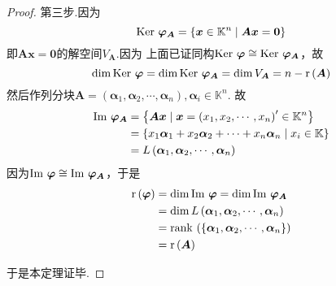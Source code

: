 {\begin{proof}
        第三步.因为
        \[
            \operatorname{Ker\,} \bm{\varphi}_{\bm{A}}
            =\left\{\bm{x}\in \mathbb{K}^n\mid\bm{Ax}=\bm{0}
            \right\}
        \]
        即$\bm{Ax}=\bm{0}$的解空间$V_{\bm{A}}$.因为
        上面已证同构$\operatorname{Ker\,} \bm{\varphi}\cong \operatorname{Ker\,} \bm{\varphi}_{\bm{A}}$，故
        \[
            \dim\operatorname{Ker\,} \bm{\varphi}=\dim\operatorname{Ker\,} \bm{\varphi}_{\bm{A}}=\dim V_{\bm{A}}=n-\mathrm{r} \left(\bm{A}
            \right)
        \]
        然后作列分块$\bm{A}=\left(\bm{\alpha}_1,\bm{\alpha}_2,\cdots,\bm{\alpha}_n\right),\bm{\alpha}_i\in \mathbb{K}^n.$
        故
        \begin{align*}
            \operatorname{Im\,}\bm{\varphi}_{\bm{A}} & =\left\{
            \bm{Ax}\mid\bm{x}=\left(x_1,x_2,\cdots,x_n\right)'\in \mathbb{K}^n
            \right\}                                                                                      \\
                                        & =\left\{x_1\bm{\alpha}_1+x_2\bm{\alpha}_2+\cdots+
            x_n\bm{\alpha}_n\mid x_i\in \mathbb{K}\right\}                                                \\
                                        & =L\left(\bm{\alpha}_1,\bm{\alpha}_2,\cdots,\bm{\alpha}_n\right)
        \end{align*}
        因为$\operatorname{Im\,}\bm{\varphi}\cong \operatorname{Im\,}\bm{\varphi}_{\bm{A}}$，于是
        \begin{align*}
            \mathrm{r} \left(\bm{\varphi}\right) & =\dim\operatorname{Im\,}\bm{\varphi}=\dim\operatorname{Im\,}\bm{\varphi}_{\bm{A}}                             \\
                                           & =\dim L\left(\bm{\alpha}_1,\bm{\alpha}_2,\cdots,\bm{\alpha}_n\right)
            \\
                                           & =\operatorname{rank\,} \left(\left\{\bm{\alpha}_1,\bm{\alpha}_2,\cdots,\bm{\alpha}_n\right\}\right) \\
                                           & =\mathrm{r} \left(\bm{A}\right)
        \end{align*}

        于是本定理证毕.
    \end{proof}
}
